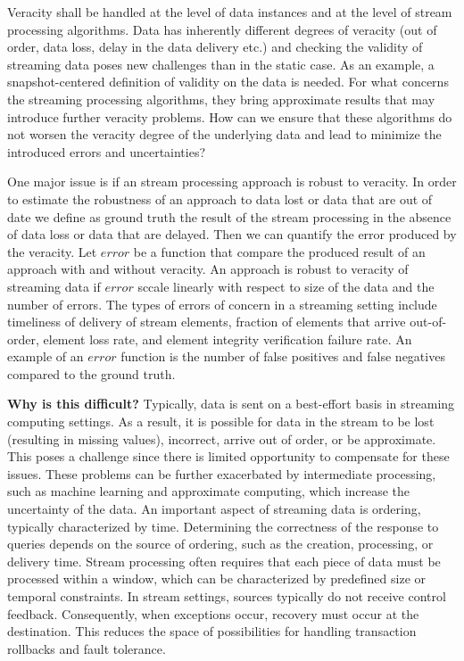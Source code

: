 Veracity shall be handled at the level of data instances and at the level of stream processing algorithms. Data has inherently different degrees of veracity (out of order, data loss, delay in the data delivery etc.) and checking the validity of streaming data poses new challenges than in the static case. As an example, a snapshot-centered definition of validity on the data is needed. 
For what concerns the streaming processing algorithms, they bring approximate results that may introduce further veracity problems. How can we ensure that these algorithms do not worsen the veracity degree of the underlying data and lead to minimize the introduced errors and uncertainties? 

One major issue is if an stream processing approach is robust to veracity. In order to estimate the robustness of an approach to data lost or data that are out of date we define as ground truth the result of the stream processing in the absence of data loss or data that are delayed. Then we can quantify the error produced by the veracity. Let $error$ be a function that compare the produced result of an approach with and without veracity. An approach is robust to veracity of streaming data if $error$ sccale linearly with respect to size of the data and the number of errors. The types of errors of concern in a streaming setting include timeliness of delivery of stream elements, fraction of elements that arrive out-of-order, element loss rate, and element integrity verification failure rate. An example of an $error$ function is the number of false positives and false negatives compared to the ground truth.

\textbf{Why is this difficult?}
Typically, data is sent on a best-effort basis in streaming computing settings. As a result, it is possible for data in the stream to be lost (resulting in missing values), incorrect, arrive out of order, or be approximate. This poses a challenge since there is limited opportunity to compensate for these issues. These problems can be further exacerbated by intermediate processing, such as machine learning and approximate computing, which increase the uncertainty of the data. An important aspect of streaming data is ordering, typically characterized by time.  Determining the correctness of the response to queries depends on the source of ordering, such as the creation, processing, or delivery time.  Stream processing often requires that each piece of data must be processed within a window, which can be characterized by predefined size or temporal constraints. In stream settings, sources typically do not receive control feedback. Consequently, when exceptions occur, recovery must occur at the destination. This reduces the space of possibilities for handling transaction rollbacks and fault tolerance.

